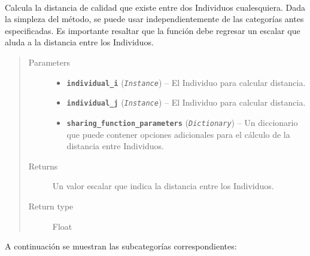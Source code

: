 \documentclass[class=report, crop=false]{standalone}
\begin{document}
\begin{fulllineitems}

~
\vspace{-0.1cm}

Calcula la distancia de calidad que existe entre dos Individuos 
cualesquiera.\break
Dada la simpleza del método, se puede usar independientemente 
de las categorías antes especificadas.\break
Es importante resaltar que la función debe regresar un escalar 
que aluda a la distancia entre los Individuos.

\begin{quote}\begin{description}
\item[{Parameters}] \leavevmode\begin{itemize}
\item \textbf{\texttt{individual\_i}} (\emph{\texttt{Instance}}) -- El Individuo para calcular distancia.
\item \textbf{\texttt{individual\_j}} (\emph{\texttt{Instance}}) -- El Individuo para calcular distancia.
\item \textbf{\texttt{sharing\_function\_parameters}} (\emph{\texttt{Dictionary}}) -- Un diccionario que puede contener opciones adicionales para
el cálculo de la distancia entre Individuos.
\end{itemize}
\item[{Returns}] \leavevmode
Un valor escalar que indica la distancia entre los Individuos.
\item[{Return type}] \leavevmode
Float
\end{description}\end{quote}

\end{fulllineitems}

A continuación se muestran las subcategorías 
correspondientes:

\end{document}
